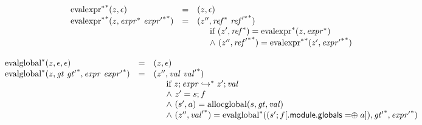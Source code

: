 $$
\begin{array}[t]{@{}lcl@{}l@{}}
{{{{\mathrm{evalexpr}}^\ast}^\ast}}{(z, \epsilon)} & = & (z, \epsilon) \\
{{{{\mathrm{evalexpr}}^\ast}^\ast}}{(z, {{\mathit{expr}}^\ast}~{{{\mathit{expr}'}^\ast}^\ast})} & = & ({z''}, {{\mathit{ref}}^\ast}~{{{\mathit{ref}'}^\ast}^\ast}) &  \\
&& \multicolumn{2}{@{}l@{}}{\quad
\quad
\begin{array}[t]{@{}l@{}}
\mbox{if}~ ({z'}, {{\mathit{ref}}^\ast}) = {{{\mathrm{evalexpr}}^\ast}}{(z, {{\mathit{expr}}^\ast})} \\
{\land}~ ({z''}, {{{\mathit{ref}'}^\ast}^\ast}) = {{{{\mathrm{evalexpr}}^\ast}^\ast}}{({z'}, {{{\mathit{expr}'}^\ast}^\ast})} \\
\end{array}
} \\
\end{array}
$$

$$
\begin{array}[t]{@{}lcl@{}l@{}}
{{{\mathrm{evalglobal}}^\ast}}{(z, \epsilon, \epsilon)} & = & (z, \epsilon) \\
{{{\mathrm{evalglobal}}^\ast}}{(z, {\mathit{gt}}~{{\mathit{gt}'}^\ast}, {\mathit{expr}}~{{\mathit{expr}'}^\ast})} & = & ({z''}, {\mathit{val}}~{{\mathit{val}'}^\ast}) &  \\
&& \multicolumn{2}{@{}l@{}}{\quad
\quad
\begin{array}[t]{@{}l@{}}
\mbox{if}~ z ; {\mathit{expr}} \hookrightarrow^\ast {z'} ; {\mathit{val}} \\
{\land}~ {z'} = s ; f \\
{\land}~ ({s'}, a) = {\mathrm{allocglobal}}(s, {\mathit{gt}}, {\mathit{val}}) \\
{\land}~ ({z''}, {{\mathit{val}'}^\ast}) = {{{\mathrm{evalglobal}}^\ast}}{(({s'} ; f{}[{.}\mathsf{module}{.}\mathsf{globals} \mathrel{{=}{\oplus}} a]), {{\mathit{gt}'}^\ast}, {{\mathit{expr}'}^\ast})} \\
\end{array}
} \\
\end{array}
$$

\vspace{1ex}

